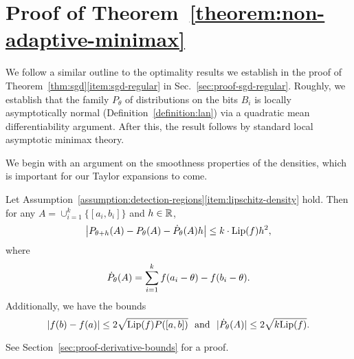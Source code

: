
\section{Proof of Theorem~\ref{theorem:non-adaptive-minimax}}
\label{sec:proof-non-adaptive-minimax}

We follow a similar outline to the optimality results we establish
in the proof of Theorem~\ref{thm:sgd}\eqref{item:sgd-regular} in
Sec.~\ref{sec:proof-sgd-regular}.
Roughly, we establish that the family $P_\theta$ of distributions
on the bits $B_i$ is locally asymptotically normal
(Definition~\ref{definition:lan}) via a quadratic
mean differentiability argument. After this, the result
follows by standard local asymptotic minimax theory.

We begin with an argument on the smoothness properties of the densities,
which is important for our Taylor expansions to come.
\begin{lemma}
  \label{lemma:derivative-bounds}
  Let
  Assumption~\ref{assumption:detection-regions}\eqref{item:lipschitz-density}
 hold. Then for any $A = \cup_{i = 1}^k
  \{[a_i, b_i]\}$ and $h \in \mathbb{R}$,
  \begin{equation*}
    \left|P_{\theta + h}(A) - P_\theta(A) - \dot{P}_\theta(A) h \right| \leq 
    k \cdot {\rm \textup{Lip}}(f) h^2,
  \end{equation*}
  where
  \begin{equation}
    \dot{P}_\theta(A) = \sum_{i = 1}^k f(a_i - \theta) - f(b_i - \theta).
    \label{eqn:expansion-dPtheta}
  \end{equation}
  Additionally, we have the bounds
  \begin{equation}
    \label{eqn:bound-density-diffs}
    |f(b) - f(a)| \le 2 \sqrt{{\rm \textup{Lip}}(f) P([a, b])}
    ~~ \mbox{and} ~~
    |\dot{P}_\theta(A)| \le 2 \sqrt{k {\rm \textup{Lip}}(f)}.
  \end{equation}
\end{lemma}
\noindent
See Section~\ref{sec:proof-derivative-bounds} for a proof.

